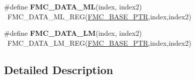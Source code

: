 \begin{DoxyCompactItemize}
\item 
\hypertarget{group___f_m_c___register___accessor___macros_gad6894b13f5c932555248630738a6872d}{}\#define {\bfseries F\+M\+C\+\_\+\+D\+A\+T\+A\+\_\+\+M\+L}(index,  index2)                            ~F\+M\+C\+\_\+\+D\+A\+T\+A\+\_\+\+M\+L\+\_\+\+R\+E\+G(\hyperlink{group___f_m_c___peripheral_ga0a740437b573e32e6b932bf729485fd9}{F\+M\+C\+\_\+\+B\+A\+S\+E\+\_\+\+P\+T\+R},index,index2)\label{group___f_m_c___register___accessor___macros_gad6894b13f5c932555248630738a6872d}

\item 
\hypertarget{group___f_m_c___register___accessor___macros_ga5f0b8b74ff368ffa871be0a39349cd59}{}\#define {\bfseries F\+M\+C\+\_\+\+D\+A\+T\+A\+\_\+\+L\+M}(index,  index2)                            ~F\+M\+C\+\_\+\+D\+A\+T\+A\+\_\+\+L\+M\+\_\+\+R\+E\+G(\hyperlink{group___f_m_c___peripheral_ga0a740437b573e32e6b932bf729485fd9}{F\+M\+C\+\_\+\+B\+A\+S\+E\+\_\+\+P\+T\+R},index,index2)\label{group___f_m_c___register___accessor___macros_ga5f0b8b74ff368ffa871be0a39349cd59}

\end{DoxyCompactItemize}


\subsection{Detailed Description}
